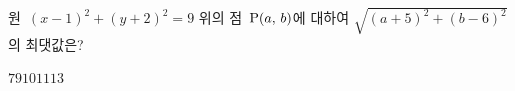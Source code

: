 원~$(x-1)^2+(y+2)^2=9$ 위의 점~$\mathrm{P}(a,\mkern3mu b)$에 대하여 $\sqrt{(a+5)^2+(b-6)^2}$의 최댓값은?
\begin{choices32}{$7$}{$9$}{$10$}{$11$}{$13$}\end{choices32}
